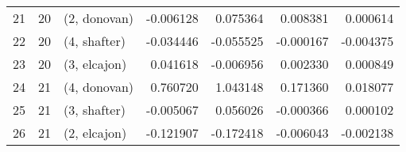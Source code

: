 \begin{tabular}{lllrrrr}
21 &    20 &  (2, donovan) & -0.006128 &  0.075364 &   0.008381 &  0.000614 \\
22 &    20 &  (4, shafter) & -0.034446 & -0.055525 &  -0.000167 & -0.004375 \\
23 &    20 &  (3, elcajon) &  0.041618 & -0.006956 &   0.002330 &  0.000849 \\
24 &    21 &  (4, donovan) &  0.760720 &  1.043148 &   0.171360 &  0.018077 \\
25 &    21 &  (3, shafter) & -0.005067 &  0.056026 &  -0.000366 &  0.000102 \\
26 &    21 &  (2, elcajon) & -0.121907 & -0.172418 &  -0.006043 & -0.002138 \\
\bottomrule
\end{tabular}

